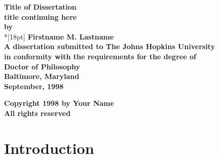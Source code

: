 \documentclass[12pt,psfig]{report}
\begin{document}
 \newcommand{\bm}[1]{ \mbox{\boldmath $ #1 $} }
 \newcommand{\bin}[2]{\left(\begin{array}{@{}c@{}} #1 \\ #2
             \end{array}\right) }
 \renewcommand{\contentsname}{Table of Contents}
 \baselineskip=24pt
 
\thispagestyle{empty}
\begin{center}
\vspace*{.25in}
{\bf\LARGE{Title of Dissertation\\   %
           title continuing here}}\\
\vspace*{.75in}
{\bf by} \\*[18pt]
\vspace*{.6in}
{\bf Firstname M. Lastname}\\
\vspace*{1.2in}
{\bf A dissertation submitted to The Johns Hopkins University\\
in conformity with the requirements for the degree of\\
Doctor of Philosophy}\\
\vspace*{.75in}
{\bf Baltimore, Maryland} \\
{\bf September, 1998} \\     %
\vspace*{.5in}
\begin{small}
{\bf Copyright 1998 by Your Name} \\ %
{\bf All rights reserved}
\end{small}
\end{center}
 
\newpage
\pagestyle{plain}


\baselineskip=24pt
\tableofcontents
\listoftables
\listoffigures
 
\chapter{Introduction}\label{chap1}
\pagestyle{myheadings}
\thispagestyle{myheadings}

 
\end{document}
